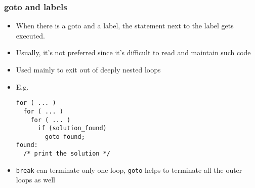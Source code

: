 \documentclass[11pt]{beamer}
\begin{document}
\begin{frame}[fragile]\frametitle{goto and labels}
\label{sec-1-21}

\begin{itemize}
\item When there is a goto and a label, the statement next to the label gets executed.
\item Usually, it's not preferred since it's difficult to read and maintain such code
\item Used mainly to exit out of deeply nested loops
\item E.g.

\begin{verbatim}
for ( ... )
  for ( ... )
    for ( ... )
      if (solution_found)
        goto found;
found: 
  /* print the solution */
\end{verbatim}
\item \verb~break~ can terminate only one loop, \verb~goto~ helps to terminate all the outer loops as well
\end{itemize}
\end{frame}
\end{document}
